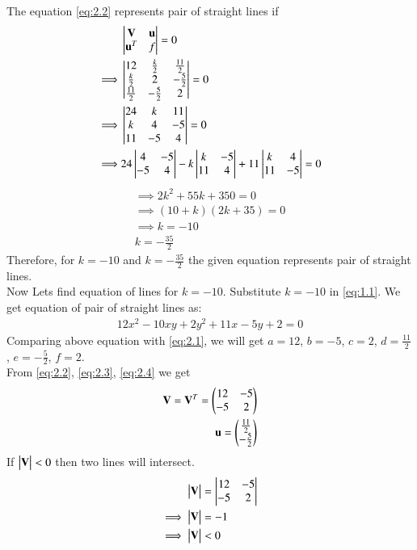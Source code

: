 \documentclass[journal,12pt,twocolumn]{IEEEtran}
\begin{document}
The equation \eqref{eq:2.2} represents pair of straight lines if
\begin{align}
    &\begin{vmatrix}\mathbf{V} & \mathbf{u} \\ \mathbf{u}^T & f\end{vmatrix}=0\\
    \implies&\begin{vmatrix}12 & \frac{k}{2} & \frac{11}{2} \\ \frac{k}{2} & 2 & -\frac{5}{2} \\ \frac{11}{2} & -\frac{5}{2} & 2\end{vmatrix}=0\label{eq:2.6}\\
    \implies&\begin{vmatrix}24 & k & 11 \\ k & 4 & -5 \\ 11 & -5 & 4\end{vmatrix}=0\\
    \implies&24\begin{vmatrix} 4 & -5 \\ -5 & 4\end{vmatrix}-k\begin{vmatrix} k & -5 \\ 11 & 4\end{vmatrix}+11\begin{vmatrix} k & 4 \\ 11 & -5\end{vmatrix}=0
\end{align}
\begin{align}
    \implies2k^2+55k+350=0\\
    \implies(10+k)(2k+35)=0\\
    \implies k=-10\nonumber\\
    k=-\frac{35}{2}
\end{align}
Therefore, for $k=-10$ and $k=-\frac{35}{2}$ the given equation represents pair of straight lines.\\
Now Lets find equation of lines for $k=-10$.
\noindent
Substitute $k=-10$ in \eqref{eq:1.1}. We get equation of pair of straight lines as:
\begin{align}
    12x^2-10xy+2y^2+11x-5y+2=0
\end{align}
Comparing above equation with \eqref{eq:2.1}, we will get $a=12$, $b=-5$, $c=2$, $d=\frac{11}{2}$, $e=-\frac{5}{2}$, $f=2$.\\
From \eqref{eq:2.2}, \eqref{eq:2.3}, \eqref{eq:2.4} we get
\begin{align}
    \mathbf{V}=\mathbf{V}^T=\begin{pmatrix}12 & -5 \\ -5 & 2\end{pmatrix}\label{eq:2.17}\\
    \mathbf{u}=\begin{pmatrix}\frac{11}{2} \\ -\frac{5}{2}\end{pmatrix}\label{eq:2.18}
\end{align}
\noindent
If $\begin{vmatrix}\mathbf{V}\end{vmatrix}<0$ then two lines will intersect.
\begin{align}
    \begin{vmatrix}\mathbf{V}\end{vmatrix}&=\begin{vmatrix}12 & -5 \\ -5 & 2\end{vmatrix}\\
    \implies\begin{vmatrix}\mathbf{V}\end{vmatrix}&=-1\\
    \implies\begin{vmatrix}\mathbf{V}\end{vmatrix}&<0
\end{align}
\end{document}
